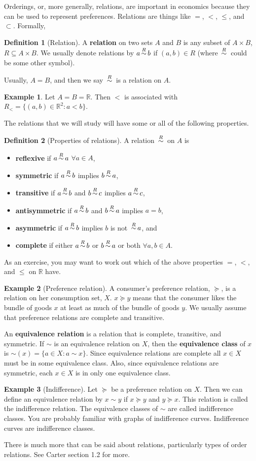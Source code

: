 \documentclass[12pt,reqno]{amsart}
\def\pref{\succeq}
\def\Re{\mathbb{R}}
\def\rel{\,{\buildrel R \over \sim}\,}
\theoremstyle{definition}
\newtheorem{definition}{Definition}[section]
\newtheorem{example}{Example}[section]
\begin{document}
Orderings, or, more generally, relations, are important in economics
because they can be used to represent preferences. Relations are
things like $=$, $<$, $\leq$, and $\subset$. Formally,
\begin{definition}[Relation]
  A \textbf{relation} on two sets $A$ and $B$ is any subset of $A
  \times B$, $R \subseteq A \times B$. We usually denote relations by
  $a \rel b$ if $(a,b) \in R$ (where $\rel$ could be some other symbol).
\end{definition}
Usually, $A=B$, and then we say $\rel$ is a relation on $A$. 
\begin{example}
  Let $A=B=\Re$. Then $<$ is associated with $R_{<} = \{(a,b) \in \Re^2
  : a<b \}$. 
\end{example}
The relations that we will study will have some or all of the
following properties.
\begin{definition}[Properties of relations]  
  A relation $\rel$ on $A$ is 
  \begin{itemize}
  \item \textbf{reflexive} if $a \rel a$ $\forall a \in A$,
  \item \textbf{symmetric} if $a \rel b$ implies $b \rel a$,
  \item \textbf{transitive} if $a \rel b$ and $b \rel c$ implies
    $a \rel c$,
  \item \textbf{antisymmetric} if $a \rel b$ and $b \rel a$
    implies $a=b$,
  \item \textbf{asymmetric} if $a \rel b$ implies $b$ is not
    $\rel a$, and
  \item \textbf{complete} if either $a \rel b$ or $b \rel a$ or
    both $\forall a, b \in A$. 
  \end{itemize}
\end{definition}
As an exercise, you may want to work out which of the above properties
$=$, $<$, and $\leq$ on $\Re$ have.
\begin{example}[Preference relation] 
  A consumer's preference relation, $\pref$, is a relation on her
  consumption set, $X$. $x \pref y$ means that the consumer likes the
  bundle of goods $x$ at least as much of the bundle of goods $y$. We
  usually assume that preference relations are complete and
  transitive.
\end{example}
An \textbf{equivalence relation} is a relation that is complete,
transitive, and symmetric. If $\sim$ is an equivalence relation on
$X$, then the \textbf{equivalence class} of $x$ is $\sim(x) = \{ a
\in X: a \sim x \}$. Since equivalence relations are complete all $x
\in X$ must be in some equivalence class. Also, since equivalence
relations are symmetric, each $x \in X$ is in only one equivalence
class. 
\begin{example}[Indifference]
  Let $\pref$ be a preference relation on $X$. Then we can define an
  equivalence relation by $x \sim y$ if $x \pref y$ and $y \pref
  x$. This relation is called the indifference relation. The
  equivalence classes of $\sim$ are called indifference classes. You
  are probably familiar with graphs of indifference
  curves. Indifference curves are indifference classes. 
\end{example}
There is much more that can be said about relations, particularly
types of order relations. See Carter section 1.2 for more. 
\end{document}
